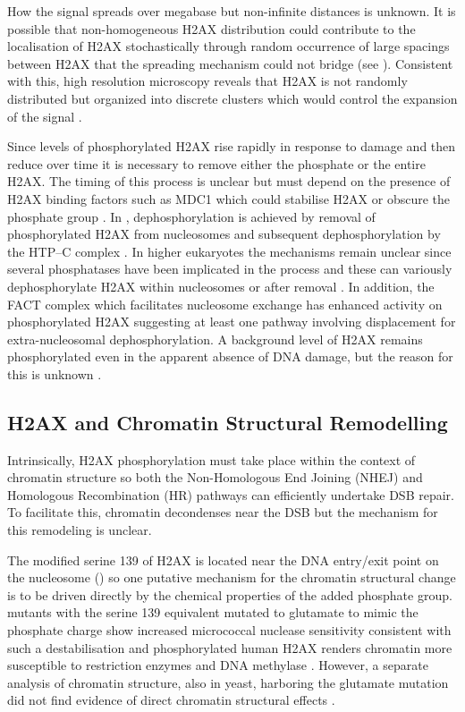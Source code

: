 How the signal spreads over megabase but non-infinite distances is
unknown. It is possible that non-homogeneous H2AX distribution could
contribute to the localisation of \textgamma H2AX stochastically
through random occurrence of large spacings between H2AX that the
spreading mechanism could not bridge (see
). Consistent with this,
high resolution microscopy reveals that H2AX is not randomly
distributed but organized into discrete clusters which would control
the expansion of the signal \citep{JBBTB06}.

Since levels of phosphorylated H2AX rise rapidly in response to damage
and then reduce over time \citep{EPR+98} it is necessary to remove
either the phosphate or the entire \textgamma H2AX\@. The timing of
this process is unclear but must depend on the presence of \textgamma
H2AX binding factors such as MDC1 which could stabilise \textgamma
H2AX or obscure the phosphate group \citep{MSJAC+05}. In
, dephosphorylation is achieved by removal of
phosphorylated H2AX from nucleosomes and subsequent dephosphorylation
by the HTP--C complex \citep{MKJK+06}. In higher eukaryotes the
mechanisms remain unclear since several phosphatases have been
implicated in the process and these can variously dephosphorylate H2AX
within nucleosomes or after removal \citep{CKI+05,KTA+06,CXZ+08}. In
addition, the FACT complex which facilitates nucleosome exchange has
enhanced activity on phosphorylated H2AX \citep{KHHK+08} suggesting at
least one pathway involving displacement for extra-nucleosomal
dephosphorylation. A background level of H2AX remains phosphorylated
even in the apparent absence of DNA damage, but the reason for this is
unknown \citep{EPR+98}.

\subsection{\textgamma H2AX and Chromatin Structural Remodelling}
Intrinsically, H2AX phosphorylation must take place within the context
of chromatin structure so both the Non-Homologous End Joining (NHEJ)
and Homologous Recombination (HR) pathways can efficiently undertake
DSB repair. To facilitate this, chromatin decondenses near the DSB
\citep{MJK+06} but the mechanism for this remodeling is unclear.

The modified serine 139 of H2AX is located near the DNA entry/exit
point on the nucleosome () so
one putative mechanism for the chromatin structural change is to be
driven directly by the chemical properties of the added phosphate
group.  mutants with the serine 139 equivalent
mutated to glutamate to mimic the phosphate charge show increased
micrococcal nuclease sensitivity consistent with such a
destabilisation \citep{JAD00} and phosphorylated human H2AX renders
chromatin more susceptible to restriction enzymes and DNA methylase
\citep{KHHK+08}. However, a separate analysis of chromatin structure,
also in yeast, harboring the glutamate mutation did not find evidence
of direct chromatin structural effects \citep{FIT07}.

